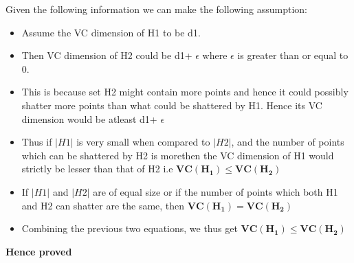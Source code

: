 \documentclass[12pt, fullpage,letterpaper]{article}
\begin{document}
\begin{enumerate}
Given the following information we can make the following assumption: 
\begin{itemize}
	\item Assume the VC dimension of H1 to be d1.
	\item Then VC dimension of H2 could be d1+ $\epsilon$ where $\epsilon$ is greater than or equal to 0. 
	\item This is because set H2 might contain more points and hence it could possibly shatter more points than what could be shattered by H1. Hence its  VC dimension would be atleast d1+ $\epsilon$ 
	\item Thus if $|H1|$ is very small when compared to $|H2|$, and the number of points which can be shattered by H2 is morethen the VC dimension of H1 would strictly be lesser than that of H2 i.e  $\mathbf{VC(H_1) \leq	VC(H_2)}$
	\item If $|H1|$  and $|H2|$ are of equal size or if the number of points which both H1 and H2 can shatter are the same, then
	$\mathbf{VC(H_1) =	VC(H_2)}$ 
	\item Combining the previous two equations, we thus get $\mathbf{VC(H_1) \leq VC(H_2)}$
\end{itemize}	
	\textbf{Hence proved}
	



\end{enumerate}
\end{document}
